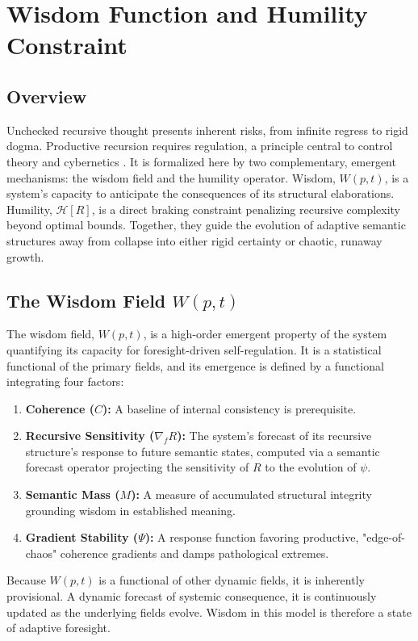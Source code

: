 \chapter{Wisdom Function and Humility Constraint}

\section{Overview}

Unchecked recursive thought presents inherent risks, from infinite regress to rigid dogma. Productive recursion requires regulation, a principle central to control theory and cybernetics \autocite{Kalman1960, AndersonMoore1990, Wiener1948, Ashby1952}. It is formalized here by two complementary, emergent mechanisms: the wisdom field and the humility operator. Wisdom, \(W(p,t)\), is a system's capacity to anticipate the consequences of its structural elaborations. Humility, \(\mathcal{H}[R]\), is a direct braking constraint penalizing recursive complexity beyond optimal bounds. Together, they guide the evolution of adaptive semantic structures away from collapse into either rigid certainty or chaotic, runaway growth.

\section{The Wisdom Field \(W(p, t)\)}

The wisdom field, \(W(p, t)\), is a high-order emergent property of the system quantifying its capacity for foresight-driven self-regulation. It is a statistical functional of the primary fields, and its emergence is defined by a functional integrating four factors:
\begin{enumerate}
    \item \textbf{Coherence (\(C\)):} A baseline of internal consistency is prerequisite.
    \item \textbf{Recursive Sensitivity (\(\nabla_f R\)):} The system's forecast of its recursive structure's response to future semantic states, computed via a semantic forecast operator projecting the sensitivity of \(R\) to the evolution of \(\psi\).
    \item \textbf{Semantic Mass (\(M\)):} A measure of accumulated structural integrity grounding wisdom in established meaning.
    \item \textbf{Gradient Stability (\(\Psi\)):} A response function favoring productive, "edge-of-chaos" coherence gradients and damps pathological extremes.
\end{enumerate}
Because \(W(p,t)\) is a functional of other dynamic fields, it is inherently provisional. A dynamic forecast of systemic consequence, it is continuously updated as the underlying fields evolve. Wisdom in this model is therefore a state of adaptive foresight.

